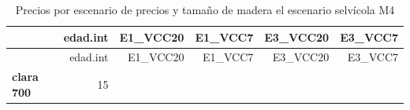 \documentclass[]{article}
\begin{document}
\begin{longtable}[]{@{}lrrrrr@{}}
\caption{Precios por escenario de precios y tamaño de madera el
escenario selvícola M4}\tabularnewline
\toprule
\begin{minipage}[b]{0.21\columnwidth}\raggedright\strut
~\strut
\end{minipage} & \begin{minipage}[b]{0.13\columnwidth}\raggedleft\strut
edad.int\strut
\end{minipage} & \begin{minipage}[b]{0.13\columnwidth}\raggedleft\strut
E1\_VCC20\strut
\end{minipage} & \begin{minipage}[b]{0.12\columnwidth}\raggedleft\strut
E1\_VCC7\strut
\end{minipage} & \begin{minipage}[b]{0.13\columnwidth}\raggedleft\strut
E3\_VCC20\strut
\end{minipage} & \begin{minipage}[b]{0.13\columnwidth}\raggedleft\strut
E3\_VCC7\strut
\end{minipage}\tabularnewline
\midrule
\endfirsthead
\toprule
\begin{minipage}[b]{0.21\columnwidth}\raggedright\strut
~\strut
\end{minipage} & \begin{minipage}[b]{0.13\columnwidth}\raggedleft\strut
edad.int\strut
\end{minipage} & \begin{minipage}[b]{0.13\columnwidth}\raggedleft\strut
E1\_VCC20\strut
\end{minipage} & \begin{minipage}[b]{0.12\columnwidth}\raggedleft\strut
E1\_VCC7\strut
\end{minipage} & \begin{minipage}[b]{0.13\columnwidth}\raggedleft\strut
E3\_VCC20\strut
\end{minipage} & \begin{minipage}[b]{0.13\columnwidth}\raggedleft\strut
E3\_VCC7\strut
\end{minipage}\tabularnewline
\midrule
\endhead
\begin{minipage}[t]{0.21\columnwidth}\raggedright\strut
\textbf{clara 700}\strut
\end{minipage} & \begin{minipage}[t]{0.13\columnwidth}\raggedleft\strut
15\strut
\end{minipage} & \begin{minipage}[t]{0.13\columnwidth}\raggedleft\strut

\end{minipage}
\end{longtable}
\end{document}
